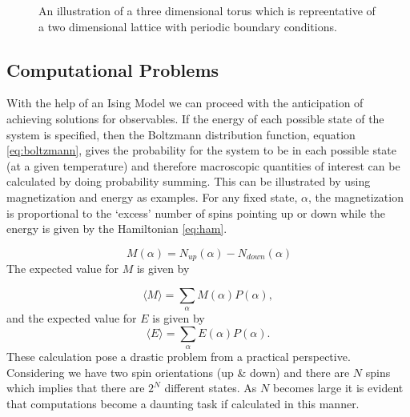 \documentclass[a4paper]{article}
\newcommand{\bra}{\langle}
\newcommand{\ket}{\rangle}
\begin{document}
\begin{figure}[htb]
  \centering
  \caption{An illustration of a three dimensional torus which is repreentative of a two dimensional lattice with periodic boundary conditions.}\label{fig:pbc}
\end{figure}


\subsection{Computational Problems}

With the help of an Ising Model we can proceed with the
anticipation of achieving solutions for observables.
If the energy of each possible state of the system is specified, then
the Boltzmann distribution function, equation \eqref{eq:boltzmann}, gives the probability
for the system to be in each possible state (at a given temperature)
and therefore macroscopic quantities of interest can be calculated by
doing probability summing. This can be illustrated by using
magnetization and energy as examples. For any 
fixed state, $\alpha$, the magnetization is proportional to the `excess'
number of spins pointing up or down while the energy is given by the
Hamiltonian \eqref{eq:ham}.

\begin{equation}
  \ M(\alpha)=N_{up}(\alpha)-N_{down}(\alpha)
\end{equation}
The expected value for $M$ is given by 

\begin{equation}
  \label{eq:prob_sum_M}
  \bra M \ket=\sum_\alpha M(\alpha)P(\alpha),
\end{equation}
and the expected value for $E$ is given by
\begin{equation}
  \label{eq:prob_sum_E}
  \langle E \rangle=\sum_\alpha E(\alpha)P(\alpha).
\end{equation}
These calculation pose a drastic problem from a practical
perspective. Considering we have two spin orientations (up \& down) and 
there are $N$ spins which implies that there are $2^N$ different
states. As $N$ becomes large it is evident that computations become a
daunting task if calculated in this manner. 
\end{document}

